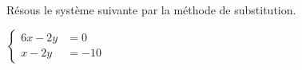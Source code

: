 %
%
    Résous le système suivante par la méthode de substitution.

    $\left\{\begin{aligned}
            6x - 2y & = 0  \\
            x-2y    & =-10
        \end{aligned}\right.$
